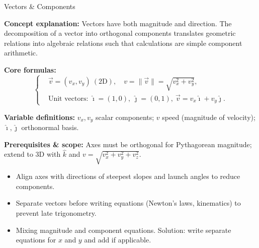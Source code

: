 \label{unit:kinematics}

\begin{KnowledgePoint}{Vectors \& Components \Core}
  \KPFormulas
  \begin{formulabox}
  \textbf{Concept explanation:} Vectors have both magnitude and direction. The decomposition of a vector into orthogonal components translates geometric relations into algebraic relations such that calculations are simple component arithmetic.

  \textbf{Core formulas:}
  \[
  \left\{\begin{aligned}
    &\vec v=(v_x,v_y)\ (\text{2D}),\quad v=\|\vec v\|=\sqrt{v_x^2+v_y^2},\\
    &\text{Unit vectors: }\hat\imath=(1,0),\ \hat\jmath=(0,1),\ \vec v=v_x\hat\imath+v_y\hat\jmath.
  \end{aligned}\right.
  \]

  \textbf{Variable definitions:} $v_x,v_y$ scalar components; $v$ speed (magnitude of velocity); $\hat\imath,\hat\jmath$ orthonormal basis.


  \textbf{Prerequisites \& scope:} Axes must be orthogonal for Pythagorean magnitude; extend to 3D with $\hat k$ and $v=\sqrt{v_x^2+v_y^2+v_z^2}$.
  \end{formulabox}

  \KPHeuristics
  \begin{heuristicsbox}
  \begin{itemize}[leftmargin=*]
    \item Align axes with directions of steepest slopes and launch angles to reduce components.
    \item Separate vectors before writing equations (Newton's laws, kinematics) to prevent late trigonometry.
  \end{itemize}
  \vspace{0.4em}
  \begin{itemize}[leftmargin=*]
    \item Mixing magnitude and component equations. Solution: write separate equations for $x$ and $y$ and add if applicable.
  \end{itemize}
  \end{heuristicsbox}


\end{KnowledgePoint}
